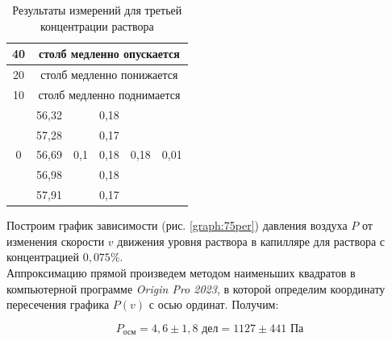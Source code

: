 \documentclass[a4paper, 12pt]{article}
\begin{document}
\begin{table}[H]
\begin{tabular}{|c|ccccc|}
            40 & \multicolumn{5}{c|}{столб медленно опускается} \\ \hline
            20 & \multicolumn{5}{c|}{столб медленно понижается} \\ \hline
            10 & \multicolumn{5}{c|}{столб медленно поднимается} \\ \hline
            \multirow{5}{*}{0} & \multicolumn{1}{c|}{56,32} & \multicolumn{1}{c|}{\multirow{5}{*}{0,1}} & \multicolumn{1}{c|}{0,18} & \multicolumn{1}{c|}{\multirow{5}{*}{0,18}} & \multirow{5}{*}{0,01} \\ \cline{2-2} \cline{4-4}
             & \multicolumn{1}{c|}{57,28} & \multicolumn{1}{c|}{} & \multicolumn{1}{c|}{0,17} & \multicolumn{1}{c|}{} &  \\ \cline{2-2} \cline{4-4}
             & \multicolumn{1}{c|}{56,69} & \multicolumn{1}{c|}{} & \multicolumn{1}{c|}{0,18} & \multicolumn{1}{c|}{} &  \\ \cline{2-2} \cline{4-4}
             & \multicolumn{1}{c|}{56,98} & \multicolumn{1}{c|}{} & \multicolumn{1}{c|}{0,18} & \multicolumn{1}{c|}{} &  \\ \cline{2-2} \cline{4-4}
             & \multicolumn{1}{c|}{57,91} & \multicolumn{1}{c|}{} & \multicolumn{1}{c|}{0,17} & \multicolumn{1}{c|}{} &  \\ \hline
            \end{tabular}
            \caption{Результаты измерений для третьей концентрации раствора}
            \label{table:0.75per}
        \end{table}

        \noindent Построим график зависимости (рис. \ref{graph:75per}) давления воздуха $P$ от изменения скорости $v$ движения уровня раствора в капилляре для раствора с концентрацией $0,075 \%$. \\

        \noindent Аппроксимацию прямой произведем методом наименьших квадратов в компьютерной программе \textit{Origin Pro 2023}, в которой определим координату пересечения графика $P(v)$ с осью ординат. Получим:

        $$
        \boxed{P_\text{осм} = 4,6 \pm 1,8 \text{ дел} = 1127 \pm 441 \text{ Па}}
        $$
\end{document}
